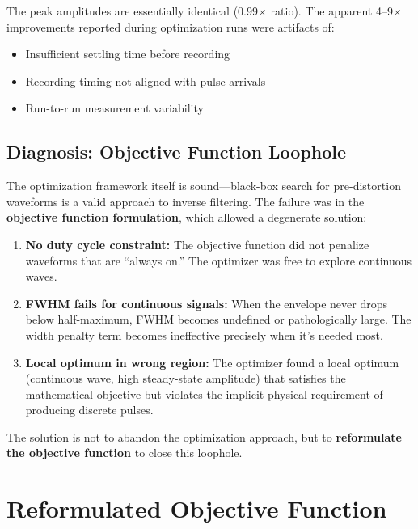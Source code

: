 \documentclass[11pt]{article}
\begin{document}
The peak amplitudes are essentially identical (0.99$\times$ ratio). The apparent 4--9$\times$ improvements reported during optimization runs were artifacts of:
\begin{itemize}
    \item Insufficient settling time before recording
    \item Recording timing not aligned with pulse arrivals
    \item Run-to-run measurement variability
\end{itemize}

\subsection{Diagnosis: Objective Function Loophole}

The optimization framework itself is sound---black-box search for pre-distortion waveforms is a valid approach to inverse filtering. The failure was in the \textbf{objective function formulation}, which allowed a degenerate solution:

\begin{enumerate}
    \item \textbf{No duty cycle constraint:} The objective function did not penalize waveforms that are ``always on.'' The optimizer was free to explore continuous waves.

    \item \textbf{FWHM fails for continuous signals:} When the envelope never drops below half-maximum, FWHM becomes undefined or pathologically large. The width penalty term becomes ineffective precisely when it's needed most.

    \item \textbf{Local optimum in wrong region:} The optimizer found a local optimum (continuous wave, high steady-state amplitude) that satisfies the mathematical objective but violates the implicit physical requirement of producing discrete pulses.
\end{enumerate}

The solution is not to abandon the optimization approach, but to \textbf{reformulate the objective function} to close this loophole.

\section{Reformulated Objective Function}
\end{document}
